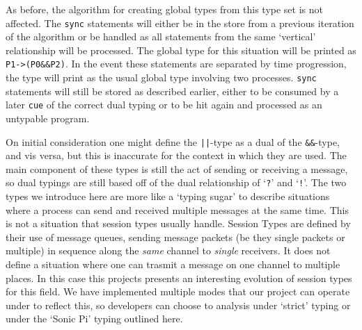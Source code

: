 \documentclass[11pt, abstracton, twoside, titlepage=true]{scrartcl}
\begin{document}
As before, the algorithm for creating global types from this type set is not
affected. The \texttt{sync} statements will either be in the store from a previous
iteration of the algorithm or be handled as all statements from the same `vertical'
relationship will be processed. The global type for this situation will be printed
as \texttt{P1->(P0\&\&P2)}. In the event these statements are separated by time
progression, the type will print as the usual global type involving two processes.
\texttt{sync} statements will still be stored as described earlier, either to be
consumed by a later \texttt{cue} of the correct dual typing or to be hit again
and processed as an untypable program.

On initial consideration one might define the \texttt{||}-type as a dual of the
\texttt{\&\&}-type, and vis versa, but this is inaccurate for the context in which
they are used. The main component of these types is still the act of sending or
receiving a message, so dual typings are still based off of the dual relationship
of `\texttt{?}' and `\texttt{!}'. The two types we introduce here are more like
a `typing sugar' to describe situations where a process can send and received
multiple messages at the same time. This is not a situation that session types
usually handle. Session Types are defined by their use of message queues, sending
message packets (be they single packets or multiple) in sequence along the 
\emph{same} channel to \emph{single} receivers. It does not define a situation
where one can trasmit a message on one channel to multiple places. In this case
this projects presents an interesting evolution of session types for this field.
We have implemented multiple modes that our project can operate under to reflect
this, so developers can choose to analysis under `strict' typing or under the
`Sonic Pi' typing outlined here.
\newpage
\end{document}
